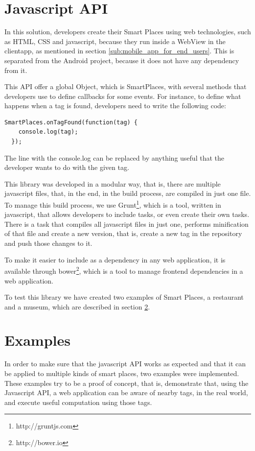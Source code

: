 \section{Javascript API}
\label{sec:javascript_api}
In this solution, developers create their Smart Places using web technologies, such as \gls{HTML}, \gls{CSS} and javascript, because they run inside a WebView in the clientapp, as mentioned in section \ref{sub:mobile_app_for_end_users}.
This is separated from the Android project, because it does not have any dependency from it.

This \gls{API} offer a global Object, which is SmartPlaces, with several methods that developers use to define callbacks for some events. For instance, to define what happens when a tag is found, developers need to write the following code:
\lstset{language=Javascript, caption=Cenas}
\begin{lstlisting}[caption=Cenas, label=a]
  SmartPlaces.onTagFound(function(tag) {
    console.log(tag);
  });
\end{lstlisting}


The line with the console.log can be replaced by anything useful that the developer wants to do with the given tag.

This library was developed in a modular way, that is, there are multiple javascript files, that, in the end, in the build process, are compiled in just one file.
To manage this build process, we use Grunt\footnote{http://gruntjs.com}, which is a tool, written in javascript, that allows developers to include tasks, or even create their own tasks. There is a task that compiles all javascript files in just one, performs minification of that file and create a new version, that is, create a new tag in the repository and push those changes to it.

To make it easier to include as a dependency in any web application, it is available through bower\footnote{http://bower.io}, which is a tool to manage frontend dependencies in a web application.

To test this library we have created two examples of Smart Places, a restaurant and a museum, which are described in section \ref{sec:examples}.

\section{Examples}
\label{sec:examples}
In order to make sure that the javascript API works as expected and that it can be applied to multiple kinds of smart places, two examples were implemented.
These examples try to be a proof of concept, that is, demonstrate that, using the Javascript API, a web application can be aware of nearby tags, in the real world, and execute useful computation using those tags.

